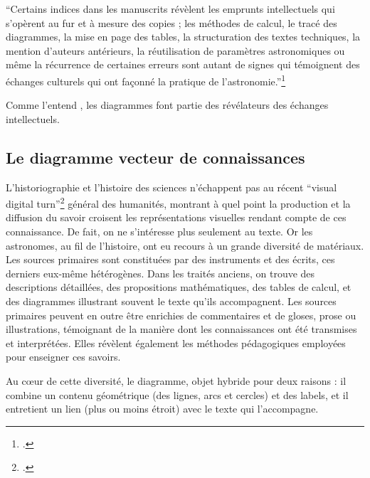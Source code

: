 \begin{kwote}
``Certains indices dans les manuscrits révèlent les emprunts
intellectuels qui s'opèrent au fur et à mesure des copies ; les méthodes
de calcul, le tracé des diagrammes, la mise en page des tables, la
structuration des textes techniques, la mention d'auteurs antérieurs, la
réutilisation de paramètres astronomiques ou même la récurrence de
certaines erreurs sont autant de signes qui témoignent des échanges
culturels qui ont façonné la pratique de l'astronomie.''\footcite[p.14]{albouy_mediation_2019}
\end{kwote}

Comme l'entend \citeauthor{albouy_mediation_2019}, les diagrammes font partie des révélateurs des
échanges intellectuels.

\hypertarget{le-diagramme-vecteur-de-connaissances}{%
\subsection{Le diagramme vecteur de
connaissances}\label{le-diagramme-vecteur-de-connaissances}}

L'historiographie et l'histoire des sciences n'échappent pas au récent
``visual digital turn''\footcite[``Digital humanities research has
  focused primarily on the analysis of texts. This emphasis stems from
  the availability of technology to study digitized text. Optical
  character recognition allows researchers to use keywords to search and
  analyze digitized texts. However, archives of digitized sources also
  contain large numbers of images.''][]{wevers_visual_2020} général des
humanités, montrant à quel point la production et la diffusion du savoir
croisent les représentations visuelles rendant compte de ces
connaissance. De fait, on ne s'intéresse plus seulement au texte. Or les
astronomes, au fil de l'histoire, ont eu recours à un grande diversité
de matériaux. Les sources primaires sont constituées par des instruments
et des écrits, ces derniers eux-même hétérogènes. Dans les traités
anciens, on trouve des descriptions détaillées, des propositions
mathématiques, des tables de calcul, et des diagrammes illustrant
souvent le texte qu'ils accompagnent. Les sources primaires peuvent en
outre être enrichies de commentaires et de gloses, prose ou
illustrations, témoignant de la manière dont les connaissances ont été
transmises et interprétées. Elles révèlent également les méthodes
pédagogiques employées pour enseigner ces savoirs.

Au cœur de cette diversité, le diagramme, objet hybride pour deux
raisons : il combine un contenu géométrique (des lignes, arcs et
cercles) et des labels, et il entretient un lien (plus ou moins étroit)
avec le texte qui l'accompagne.

